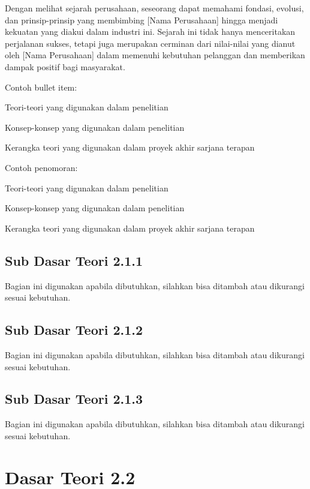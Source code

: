 Dengan melihat sejarah perusahaan, seseorang dapat memahami fondasi, evolusi, dan prinsip-prinsip yang membimbing [Nama Perusahaan] hingga menjadi kekuatan yang diakui dalam industri ini. Sejarah ini tidak hanya menceritakan perjalanan sukses, tetapi juga merupakan cerminan dari nilai-nilai yang dianut oleh [Nama Perusahaan] dalam memenuhi kebutuhan pelanggan dan memberikan dampak positif bagi masyarakat.

Contoh bullet item:
\begin{packed_item}
    \item Teori-teori yang digunakan dalam penelitian
    \item Konsep-konsep yang digunakan dalam penelitian
    \item Kerangka teori yang digunakan dalam proyek akhir sarjana terapan
\end{packed_item}

Contoh penomoran:
\begin{packed_enum}
	\item Teori-teori yang digunakan dalam penelitian
	\item Konsep-konsep yang digunakan dalam penelitian
	\item Kerangka teori yang digunakan dalam proyek akhir sarjana terapan
\end{packed_enum}

\subsection{Sub Dasar Teori 2.1.1}
Bagian ini digunakan apabila dibutuhkan, silahkan bisa ditambah atau dikurangi sesuai kebutuhan.

\subsection{Sub Dasar Teori 2.1.2}
Bagian ini digunakan apabila dibutuhkan, silahkan bisa ditambah atau dikurangi sesuai kebutuhan.

\subsection{Sub Dasar Teori 2.1.3}
Bagian ini digunakan apabila dibutuhkan, silahkan bisa ditambah atau dikurangi sesuai kebutuhan.

\section{Dasar Teori 2.2}
\lipsum


